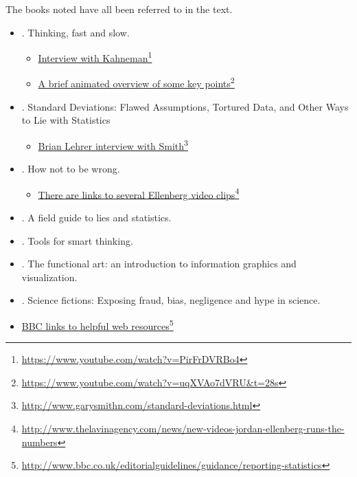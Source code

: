\documentclass[
  10pt,
  b5paper]{book}
\providecommand{\tightlist}{%
  \setlength{\itemsep}{0pt}\setlength{\parskip}{0pt}}
\begin{document}
The books noted have all been referred to in the text.

\begin{itemize}
\tightlist
\item
  \citet{kahneman_2013} . Thinking, fast and slow.

  \begin{itemize}
  \tightlist
  \item
    \href{https://www.youtube.com/watch?v=PirFrDVRBo4}{Interview with Kahneman}\footnote{\url{https://www.youtube.com/watch?v=PirFrDVRBo4}}
  \item
    \href{https://www.youtube.com/watch?v=uqXVAo7dVRU\&t=28s}{A brief animated overview of some key points}\footnote{\url{https://www.youtube.com/watch?v=uqXVAo7dVRU\&t=28s}}
  \end{itemize}
\item
  \citet{smith-sd} . Standard Deviations: Flawed Assumptions, Tortured Data, and Other Ways to Lie with Statistics

  \begin{itemize}
  \tightlist
  \item
    \href{http://www.garysmithn.com/standard-deviations.html}{Brian Lehrer interview with Smith}\footnote{\url{http://www.garysmithn.com/standard-deviations.html}}
  \end{itemize}
\item
  \citet{ellenberg_2015} . How not to be wrong.

  \begin{itemize}
  \tightlist
  \item
    \href{http://www.thelavinagency.com/news/new-videos-jordan-ellenberg-runs-the-numbers}{There are links to several Ellenberg video clips}\footnote{\url{http://www.thelavinagency.com/news/new-videos-jordan-ellenberg-runs-the-numbers}}
  \end{itemize}
\item
  \citet{levitin_2016} . A field guide to lies and statistics.
\item
  \citet{nisbett} . Tools for smart thinking.
\item
  \citet{cairo_2013} . The functional art: an introduction to information
  graphics and visualization.
\item
  \citet{ritchie2020science} . Science fictions: Exposing fraud, bias,
  negligence and hype in science.
\item
  \href{http://www.bbc.co.uk/editorialguidelines/guidance/reporting-statistics}{BBC links to helpful web resources}\footnote{\url{http://www.bbc.co.uk/editorialguidelines/guidance/reporting-statistics}}
\end{itemize}

  
\end{document}
